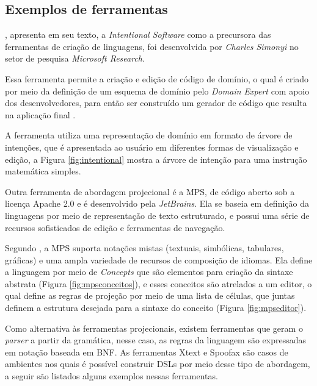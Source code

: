 \newpage
\subsection{Exemplos de ferramentas}
\label{exemplosferramentasdsl}

, apresenta em seu texto, a \textit{Intentional Software} como a precursora das ferramentas de criação de linguagens, foi desenvolvida por \textit{Charles Simonyi} no setor de pesquisa \textit{Microsoft Research}. 

Essa ferramenta permite a criação e edição de código de domínio, o qual é criado por meio da definição de um esquema de domínio pelo \textit{Domain Expert} com apoio dos desenvolvedores, para então ser construído um gerador de código que resulta na aplicação final \cite{simonyi2006intentional}. 

A ferramenta utiliza uma representação de domínio em formato de árvore de intenções, que é apresentada ao usuário em diferentes formas de visualização e edição, a Figura \ref{fig:intentional} mostra a árvore de intenção para uma instrução matemática simples.



Outra ferramenta de abordagem projecional é a \gls{MPS}, de código aberto sob a licença Apache 2.0 e é desenvolvido pela \textit{JetBrains}. Ela se baseia em definição da linguagens por meio de representação de texto estruturado, e possui uma série de recursos sofisticados de edição e ferramentas de navegação. 

Segundo , a \gls{MPS} suporta notações mistas (textuais, simbólicas, tabulares, gráficas) e uma ampla variedade de recursos de composição de idiomas. Ela define a linguagem por meio de \textit{Concepts} que são elementos para criação da sintaxe abstrata (Figura \ref{fig:mpsconceitos}), e esses conceitos são atrelados a um editor, o qual define as regras de projeção por meio de uma lista de células, que juntas definem a estrutura desejada para a sintaxe do conceito (Figura \ref{fig:mpseditor}).





\newpage


Como alternativa às ferramentas projecionais, existem ferramentas que geram o \textit{parser} a partir da gramática, nesse caso, as regras da linguagem são expressadas em notação baseada em \gls{BNF}. As ferramentas Xtext e Spoofax são casos de ambientes nos quais é possível construir \gls{DSL}s por meio desse tipo de abordagem, a seguir são listados alguns exemplos nessas ferramentas.


